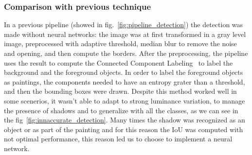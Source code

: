 \subsubsection{Comparison with previous technique}
In a previous pipeline (showed in fig.~\ref{fig:pipeline_detection}) the detection was made without neural networks: the image was at first transformed in a gray level image, preprocessed with adaptive threshold, median blur \cite{median-blur} to remove the noise and opening, and then compute the borders.
After the preprocessing, the pipeline uses the result to compute the Connected Component Labeling~\cite{Grana_ccl} to label the background and the foreground objects.
In order to label the foreground objects as paintings, the components needed to have an entropy grater than a threshold, and then the bounding boxes were drawn.
Despite this method worked well in some scenerios, it wasn't able to adapt to strong luminance variation, to manage the presence of shadows and to generalize with all the classes, as we can see in the fig~\ref{fig:innaccurate_detection}. Many times the shadow was recognized as an object or as part of the painting and for this reason the IoU was computed with not optimal performance, this reason led us to choose to implement a neural network.

